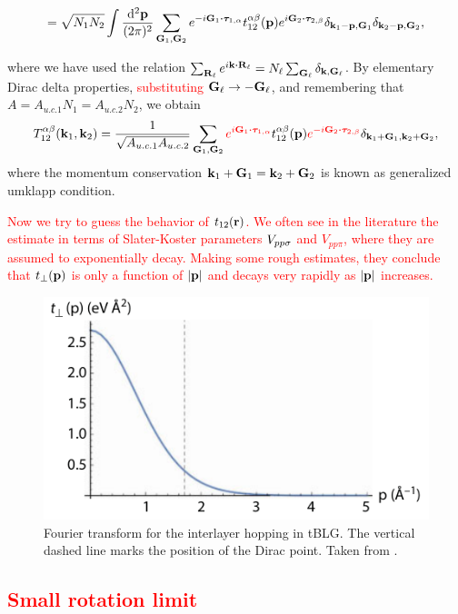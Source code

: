\documentclass[a4paper,12pt]{report}
\begin{document}
$$
= \sqrt{N_1 N_2} \int \frac{\dd[2]{\p}}{(2\pi)^2}
\sum_{\G_1, \G_2} e^{-i\G_1\vdot\vtau_{1,\alpha}} t_{12}^{\alpha\beta}(\p)
e^{i\G_2\vdot\vtau_{2,\beta}} \delta_{\k_1-\p,\G_1} \delta_{\k_2-\p,\G_2},
$$

where we have used the relation $\sum_{\R_\ell} e^{i\k\vdot\R_\ell} = N_\ell \sum_{\G_\ell} \delta_{\k,\G_\ell}$. By elementary Dirac delta properties, \textcolor{red}{substituting ${\vb{G}}_\ell \to -{\vb{G}}_\ell$}, and remembering that $A = A_{u.c.1} N_1 = A_{u.c.2} N_2$, we obtain
\begin{equation} \label{eq:interlayer-hopping-simplified}
T_{12}^{\alpha\beta}(\k_1,\k_2) = \frac{1}{\sqrt{A_{u.c.1} A_{u.c.2}}}
\sum_{\G_1, \G_2} \textcolor{red}{e^{i\G_1\vdot\vtau_{1,\alpha}}} t_{12}^{\alpha\beta}(\p)
\textcolor{red}{e^{-i\G_2\vdot\vtau_{2,\beta}}} \delta_{\k_1+\G_1, \k_2+\G_2},
\end{equation}
where the momentum conservation $ {\vb{k}}_1 + {\vb{G}}_1 = {\vb{k}}_2 + {\vb{G}}_2 $ is known as generalized umklapp condition.

\n

\textcolor{red}{
Now we try to guess the behavior of $t_{12}({\vb{r}})$. We often see in the literature the estimate in terms of Slater-Koster parameters $V_{pp\sigma}$ and $V_{pp\pi}$, where they are assumed to exponentially decay. Making some rough estimates, they conclude that $t_\perp({\vb{p}})$ is only a function of $\abs{{\vb{p}}}$ and decays very rapidly as $\abs{{\vb{p}}}$ increases.
}

\begin{figure}[H]
\centering
\includegraphics[width=0.6\linewidth]{fig/tperp.png}
\caption{Fourier transform for the interlayer hopping in tBLG. The vertical dashed line marks the position
of the Dirac point. Taken from \cite{handbook2019}.}
\label{fig:tperp}
\end{figure}

\subsection{\textcolor{red}{Small rotation limit}}
\end{document}
